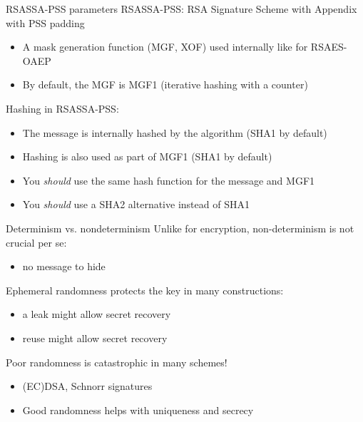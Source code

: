 \begin{frame}{RSASSA-PSS parameters}
  RSASSA-PSS: RSA Signature Scheme with Appendix with PSS padding
  \begin{itemize}[<+(1)->]
    \item A mask generation function (MGF, XOF) used internally like for RSAES-OAEP
    \item By default, the MGF is MGF1 (iterative hashing with a counter)
  \end{itemize}

  \vfill

  \pause
  Hashing in RSASSA-PSS:
  \begin{itemize}[<+(1)->]
    \item The message is internally hashed by the algorithm (SHA1 by default)
    \item Hashing is also used as part of MGF1 (SHA1 by default)
    \item You \emph{should} use the same hash function for the message and MGF1
    \item You \emph{should} use a SHA2 alternative instead of SHA1
  \end{itemize}
\end{frame}

\begin{frame}{Determinism vs. nondeterminism}
  \pause
  Unlike for encryption, non-determinism is not crucial per se:
  \begin{itemize}[<+(1)->]
    \item no message to hide
  \end{itemize}

  \vspace*{0.5em}

  \pause
  Ephemeral randomness protects the key in many constructions:
  \begin{itemize}[<+(1)->]
    \item a leak might allow secret recovery
    \item reuse might allow secret recovery
  \end{itemize}

  \vspace*{0.5em}

  \pause
  Poor randomness is catastrophic in many schemes!
  \begin{itemize}[<+(1)->]
    \item (EC)DSA, Schnorr signatures
    \item Good randomness helps with uniqueness and secrecy
  \end{itemize}
\end{frame}

